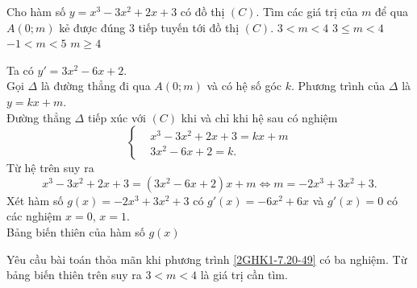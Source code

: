 \begin{ex}%
 Cho hàm số $y=x^3-3x^2+2x+3$ có đồ thị $(C)$. Tìm các giá trị của $m$ để qua $A(0;m)$ kẻ được đúng $3$ tiếp tuyến tới đồ thị $(C)$.
 \choice
  {\True $3<m<4$}
  {$3\leq m<4$}
  {$-1<m<5$}
  {$m\geq 4$}
 \loigiai
  {
  Ta có $y'=3x^2-6x+2$.\\
  Gọi $\Delta$ là đường thẳng đi qua $A(0;m)$ và có hệ số góc $k$. Phương trình của $\Delta$ là $y=kx+m$.\\
  Đường thẳng $\Delta$ tiếp xúc với $(C)$ khi và chỉ khi hệ sau có nghiệm
  \[\left\{\begin{aligned}&x^3-3x^2+2x+3=kx+m \\&3x^2-6x+2=k.\end{aligned}\right.\]
  Từ hệ trên suy ra
  \[x^3-3x^2+2x+3=(3x^2-6x+2)x+m \Leftrightarrow m=-2x^3+3x^2+3.\tag{$*$}\label{2GHK1-7.20-49}\]
  Xét hàm số $g(x)=-2x^3+3x^2+3$ có $g'(x)=-6x^2+6x$ và $g'(x)=0$ có các nghiệm $x=0$, $x=1$.\\
  Bảng biến thiên của hàm số $g(x)$
  \begin{center}
  \end{center}
  Yêu cầu bài toán thỏa mãn khi phương trình \eqref{2GHK1-7.20-49} có ba nghiệm. Từ bảng biến thiên trên suy ra $3<m<4$ là giá trị cần tìm.
  }
\end{ex}

